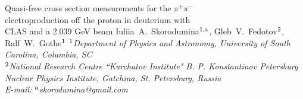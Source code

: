 \thispagestyle{empty}

\vskip100pt


\begin{center}

{\LARGE Quasi-free cross section measurements for the $\pi^{+}\pi^{-}$ \\[-12pt] electroproduction off the proton in deuterium with \\[3pt]  CLAS and a 2.039 GeV beam}
\vskip25pt
{\large Iuliia~A.~Skorodumina$^{\rm 1,a}$, Gleb~V.~Fedotov$^{\rm 2}$, Ralf~W.~Gothe$^{\rm 1}$}
\vskip10pt
{\it \footnotesize$^{\rm 1}$Department of Physics and Astronomy, University of South Carolina, Columbia, SC}\\[10pt]
{\it \footnotesize$^{\rm 2}$National Research Centre ``Kurchatov Institute" B. P. Konstantinov Petersburg Nuclear Physics Institute, Gatchina, St. Petersburg, Russia}\\
[20pt]
{\it \footnotesize E-mail: $^{\rm a}$skorodumina@gmail.com}

\end{center}

